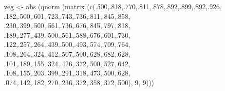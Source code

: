 \documentclass[
  12pt,
]{book}
\newenvironment{Shaded}{\begin{snugshade}}{\end{snugshade}}
\newcommand{\DecValTok}[1]{\textcolor[rgb]{0.00,0.00,0.81}{#1}}
\newcommand{\FunctionTok}[1]{\textcolor[rgb]{0.00,0.00,0.00}{#1}}
\newcommand{\NormalTok}[1]{#1}
\newcommand{\OtherTok}[1]{\textcolor[rgb]{0.56,0.35,0.01}{#1}}
\theoremstyle{definition}
\theoremstyle{definition}
\theoremstyle{definition}
\theoremstyle{definition}
\theoremstyle{remark}
\begin{document}
\begin{Shaded}
\begin{Highlighting}[]
\NormalTok{veg }\OtherTok{\textless{}{-}} \FunctionTok{abs}\NormalTok{ (}\FunctionTok{qnorm}\NormalTok{ (}\FunctionTok{matrix}\NormalTok{ (}\FunctionTok{c}\NormalTok{(.}\DecValTok{500}\NormalTok{,.}\DecValTok{818}\NormalTok{,.}\DecValTok{770}\NormalTok{,.}\DecValTok{811}\NormalTok{,.}\DecValTok{878}\NormalTok{,.}\DecValTok{892}\NormalTok{,.}\DecValTok{899}\NormalTok{,.}\DecValTok{892}\NormalTok{,.}\DecValTok{926}\NormalTok{,}
\NormalTok{.}\DecValTok{182}\NormalTok{,.}\DecValTok{500}\NormalTok{,.}\DecValTok{601}\NormalTok{,.}\DecValTok{723}\NormalTok{,.}\DecValTok{743}\NormalTok{,.}\DecValTok{736}\NormalTok{,.}\DecValTok{811}\NormalTok{,.}\DecValTok{845}\NormalTok{,.}\DecValTok{858}\NormalTok{,}
\NormalTok{.}\DecValTok{230}\NormalTok{,.}\DecValTok{399}\NormalTok{,.}\DecValTok{500}\NormalTok{,.}\DecValTok{561}\NormalTok{,.}\DecValTok{736}\NormalTok{,.}\DecValTok{676}\NormalTok{,.}\DecValTok{845}\NormalTok{,.}\DecValTok{797}\NormalTok{,.}\DecValTok{818}\NormalTok{,}
\NormalTok{.}\DecValTok{189}\NormalTok{,.}\DecValTok{277}\NormalTok{,.}\DecValTok{439}\NormalTok{,.}\DecValTok{500}\NormalTok{,.}\DecValTok{561}\NormalTok{,.}\DecValTok{588}\NormalTok{,.}\DecValTok{676}\NormalTok{,.}\DecValTok{601}\NormalTok{,.}\DecValTok{730}\NormalTok{,}
\NormalTok{.}\DecValTok{122}\NormalTok{,.}\DecValTok{257}\NormalTok{,.}\DecValTok{264}\NormalTok{,.}\DecValTok{439}\NormalTok{,.}\DecValTok{500}\NormalTok{,.}\DecValTok{493}\NormalTok{,.}\DecValTok{574}\NormalTok{,.}\DecValTok{709}\NormalTok{,.}\DecValTok{764}\NormalTok{,}
\NormalTok{.}\DecValTok{108}\NormalTok{,.}\DecValTok{264}\NormalTok{,.}\DecValTok{324}\NormalTok{,.}\DecValTok{412}\NormalTok{,.}\DecValTok{507}\NormalTok{,.}\DecValTok{500}\NormalTok{,.}\DecValTok{628}\NormalTok{,.}\DecValTok{682}\NormalTok{,.}\DecValTok{628}\NormalTok{,}
\NormalTok{.}\DecValTok{101}\NormalTok{,.}\DecValTok{189}\NormalTok{,.}\DecValTok{155}\NormalTok{,.}\DecValTok{324}\NormalTok{,.}\DecValTok{426}\NormalTok{,.}\DecValTok{372}\NormalTok{,.}\DecValTok{500}\NormalTok{,.}\DecValTok{527}\NormalTok{,.}\DecValTok{642}\NormalTok{,}
\NormalTok{.}\DecValTok{108}\NormalTok{,.}\DecValTok{155}\NormalTok{,.}\DecValTok{203}\NormalTok{,.}\DecValTok{399}\NormalTok{,.}\DecValTok{291}\NormalTok{,.}\DecValTok{318}\NormalTok{,.}\DecValTok{473}\NormalTok{,.}\DecValTok{500}\NormalTok{,.}\DecValTok{628}\NormalTok{,}
\NormalTok{.}\DecValTok{074}\NormalTok{,.}\DecValTok{142}\NormalTok{,.}\DecValTok{182}\NormalTok{,.}\DecValTok{270}\NormalTok{,.}\DecValTok{236}\NormalTok{,.}\DecValTok{372}\NormalTok{,.}\DecValTok{358}\NormalTok{,.}\DecValTok{372}\NormalTok{,.}\DecValTok{500}\NormalTok{), }\DecValTok{9}\NormalTok{, }\DecValTok{9}\NormalTok{)))}
\end{Highlighting}
\end{Shaded}
\end{document}
